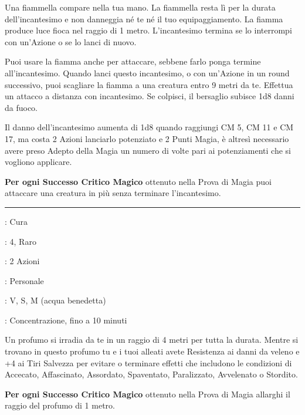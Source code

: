 \begin{multicols}{2}
Una fiammella compare nella tua mano. La fiammella resta lì per la durata dell'incantesimo e non danneggia né te né il tuo equipaggiamento. La fiamma produce luce fioca nel raggio di 1 metro. L'incantesimo termina se lo interrompi con un'Azione o se lo lanci di nuovo.

Puoi usare la fiamma anche per attaccare, sebbene farlo ponga termine all'incantesimo. Quando lanci questo incantesimo, o con un'Azione in un round successivo, puoi scagliare la fiamma a una creatura entro 9 metri da te. Effettua un attacco a distanza con incantesimo. Se colpisci, il bersaglio subisce 1d8 danni da fuoco.

Il danno dell'incantesimo aumenta di 1d8 quando raggiungi CM 5, CM 11 e CM 17, ma costa 2 Azioni lanciarlo potenziato e 2 Punti Magia, è altresì necessario avere preso Adepto della Magia un numero di volte pari ai potenziamenti che si vogliono applicare.

\textbf{Per ogni Successo Critico Magico} ottenuto nella Prova di Magia puoi attaccare una creatura in più senza terminare l'incantesimo.

\smallskip\noindent\rule{\linewidth}{2pt} \hypertarget{Profumo di Atherim}{}\medskip{}\label{Aura of Purity}
\noindent
\begin{description}[noitemsep, topsep=0pt, parsep=0pt, partopsep=0pt, leftmargin=0cm, labelwidth=2.8cm]
	\item[\textbf{Lista di Magia}] : Cura
	\item[\textbf{Livello}] : 4, Raro
	\item[\textbf{T. di Lancio}] : 2 Azioni
	\item[\textbf{Gittata}] : Personale
	\item[\textbf{Componenti}] : V, S, M (acqua benedetta)
	\item[\textbf{Durata}] : Concentrazione, fino a 10 minuti
\end{description}

Un profumo si irradia da te in un raggio di 4 metri per tutta la durata. Mentre si trovano in questo profumo tu e i tuoi alleati avete Resistenza ai danni da veleno e +4 ai Tiri Salvezza per evitare o terminare effetti che includono le condizioni di Accecato, Affascinato, Assordato, Spaventato, Paralizzato, Avvelenato o Stordito.

\textbf{Per ogni Successo Critico Magico} ottenuto nella Prova di Magia allarghi il raggio del profumo di 1 metro.


\end{multicols}
